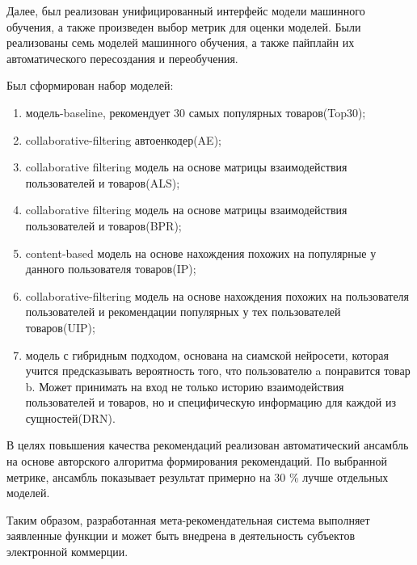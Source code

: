 \documentclass[14pt]{mmcs_article}
\newenvironment{myenumerate}
{ \begin{enumerate}
		\setlength{\itemsep}{0pt}
		\setlength{\parskip}{0pt}
		\setlength{\parsep}{0pt}     }
	{ \end{enumerate}                  }
\begin{document}
Далее, был реализован унифицированный интерфейс модели машинного обучения, а также произведен выбор метрик для оценки моделей. Были реализованы семь моделей машинного обучения, а также пайплайн их автоматического пересоздания и переобучения.

Был сформирован набор моделей:
\begin{myenumerate}
	\item модель-baseline, рекомендует 30 самых популярных товаров(Top30);
	\item collaborative-filtering автоенкодер(AE);
	\item collaborative filtering модель на основе матрицы взаимодействия пользователей и товаров(ALS);
	\item collaborative filtering модель на основе матрицы взаимодействия пользователей и товаров(BPR);
	\item content-based модель на основе нахождения похожих на популярные у данного пользователя товаров(IP);
	\item collaborative-filtering модель на основе нахождения похожих на пользователя пользователей и рекомендации популярных у тех пользователей товаров(UIP);
	\item модель с гибридным подходом, основана на сиамской нейросети, которая учится предсказывать вероятность того, что пользователю a понравится товар b. Может принимать на вход не только историю взаимодействия пользователей и товаров, но и специфическую информацию для каждой из сущностей(DRN).
\end{myenumerate}

В целях повышения качества рекомендаций реализован автоматический ансамбль на основе авторского алгоритма формирования рекомендаций. По выбранной метрике, ансамбль показывает результат примерно на 30 \% лучше отдельных моделей.

Таким образом, разработанная мета-рекомендательная система выполняет заявленные функции и может быть внедрена в деятельность субъектов электронной коммерции.

\newpage

\renewcommand{\refname}{\centering \textbf{Литература}}

\end{document}
